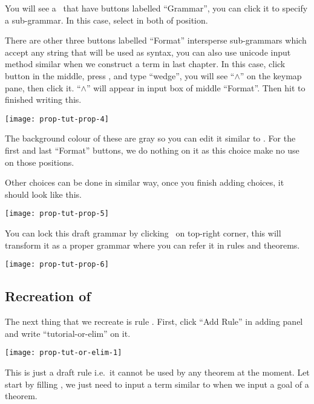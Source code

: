 \documentclass[master.tex]{subfiles}
\begin{document}
You will see a \kChoice\ that have buttons labelled ``Grammar'', you can
click it to specify a sub-grammar. In this case, select  in
both of position.

There are other three buttons labelled ``Format'' intersperse sub-grammars which
accept any string that will be used as syntax, you can also use unicode input
method similar when we construct a term in last chapter. In this case, click
button in the middle, press , and type ``wedge'', you will see
``$\wedge$'' on the keymap pane, then click it. ``$\wedge$'' will appear in
input box of middle ``Format''. Then hit  to finished writing this.

\begin{center}
  \texttt{[image: prop-tut-prop-4]}
\end{center}

The background colour of these are gray so you can edit it similar to
\kMetaVarRegex. For the first and last ``Format'' buttons, we do nothing on it
as this choice make no use on those positions.

Other choices can be done in similar way, once you finish adding choices, it
should look like this.

\begin{center}
  \texttt{[image: prop-tut-prop-5]}
\end{center}

You can lock this draft grammar by clicking \lockButton\ on top-right corner,
this will transform it as a proper grammar where you can refer it in rules and
theorems.

\begin{center}
  \texttt{[image: prop-tut-prop-6]}
\end{center}

\subsection{Recreation of }

The next thing that we recreate is rule . First, click ``Add
Rule'' in adding panel and write ``tutorial-or-elim'' on it.

\begin{center}
  \texttt{[image: prop-tut-or-elim-1]}
\end{center}

This is just a draft rule i.e.\ it cannot be used by any theorem at the moment.
Let start by filling \kConclusion, we just need to input a term similar to when
we input a goal of a theorem.
\end{document}
